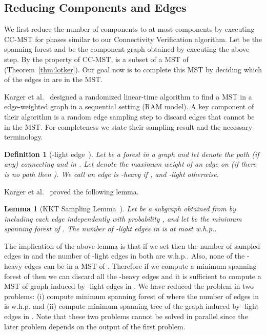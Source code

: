 \documentclass[11pt]{article}
\newtheorem{lemma}[theorem]{Lemma}
\newtheorem{definition}[theorem]{Definition}
\begin{document}
\subsection{Reducing Components and Edges}
We first reduce the number of components to at most  components by executing \textsc{CC-MST} for  phases similar to our Connectivity Verification algorithm. 
Let  be the spanning forest and  be the component graph obtained by executing the above step. 
By the property of \textsc{CC-MST},  is a subset of a MST of  (Theorem~\ref{thm:lotker}). 
Our goal now is to complete this MST by deciding which of the edges in  are in the MST. 

Karger et al.~\cite{KKT1995MST} designed a randomized linear-time algorithm to find a MST in a edge-weighted graph in a sequential setting (RAM model).
A key component of their algorithm is a random edge sampling step to discard edges that cannot be in the MST. 
For completeness we state their sampling result and the necessary terminology.
\begin{definition}[-light edge~\cite{KKT1995MST}] 
 Let  be a forest in a graph  and let  denote the path (if any) connecting  and  in . 
 Let  denote the maximum weight of an edge on  (if there is no path then ). 
 We call an edge  is \emph{-heavy} if , and \emph{-light} otherwise. 
\end{definition}
\noindent Karger et al.~\cite{KKT1995MST} proved the following lemma. 
\begin{lemma}[KKT Sampling Lemma~\cite{KKT1995MST}]
 \label{lemma:kkt}
Let  be a subgraph obtained from  by including each edge independently with probability ,
and let  be the minimum spanning forest of . 
The number of -light edges in  is at most  w.h.p.. 
\end{lemma}
\noindent The implication of the above lemma is that if we set  then the number of sampled edges in  and the number of -light edges in  both are  w.h.p.. 
Also, none of the -heavy edges can be in a MST of . 
Therefore if we compute a minimum spanning forest  of  then we can discard all the -heavy edges and 
it is sufficient to compute a MST of graph induced by -light edges in . 
We have reduced the problem in two problems: (i) compute minimum spanning forest  of  where the number of edges in  is  w.h.p. and (ii) compute minimum spanning tree of the graph induced by -light edges in . 
Note that these two problems cannot be solved in parallel since the later problem depends on the output of the first problem. 
\end{document}
